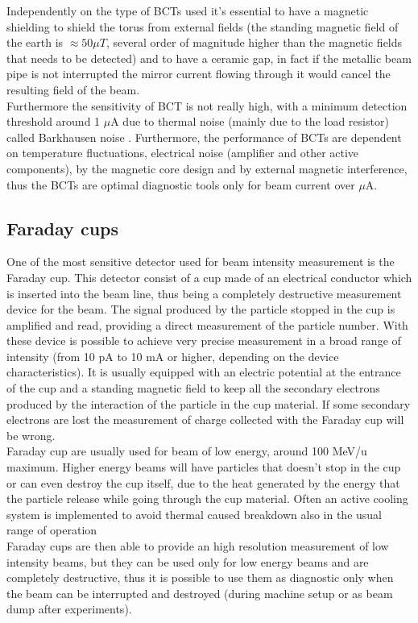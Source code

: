 \documentclass[12pt,a4paper]{report}
\begin{document}
	Independently on the type of BCTs used it's essential to have a magnetic shielding to shield the torus from external fields (the standing magnetic field of the earth is $\approx 50 \mu T$, several order of magnitude higher than the magnetic fields that needs to be detected) and to have a ceramic gap, in fact if the metallic beam pipe is not interrupted the mirror current flowing through it would cancel the resulting field of the beam. \\
	Furthermore the sensitivity of BCT is not really high, with a minimum detection threshold around 1 $\mu$A due to thermal noise (mainly due to the load resistor) called Barkhausen noise \cite{Bk_noise}. Furthermore, the performance of BCTs are dependent on temperature fluctuations, electrical noise (amplifier and other active components), by the magnetic core design and by external magnetic interference, thus the BCTs are optimal diagnostic tools only for beam current over $\mu$A.
	\subsection{Faraday cups}
	One of the most sensitive detector used for beam intensity measurement is the Faraday cup. This detector consist of a cup made of an electrical conductor which is inserted into the beam line, thus being a completely destructive measurement device for the beam. The signal produced by the particle stopped in the cup is amplified and read, providing a direct measurement of the particle number. With these device is possible to achieve very precise measurement in a broad range of intensity (from 10 pA to 10 mA or higher, depending on the device characteristics). It is usually equipped with an electric potential at the entrance of the cup and a standing magnetic field to keep all the secondary electrons produced by the interaction of the particle in the cup material. If some secondary electrons are lost the measurement of charge collected with the Faraday cup will be wrong. \\
	Faraday cup are usually used for beam of low energy, around 100 MeV/u maximum. Higher energy beams will have particles that doesn't stop in the cup or can even destroy the cup itself, due to the heat generated by the energy that the particle release while going through the cup material. Often an active cooling system is implemented to avoid thermal caused breakdown also in the usual range of operation\\
	Faraday cups are then able to provide an high resolution measurement of low intensity beams, but they can be used only for low energy beams and are completely destructive, thus it is possible to use them as diagnostic only when the beam can be interrupted and destroyed (during machine setup or as beam dump after experiments).\\
\end{document}
